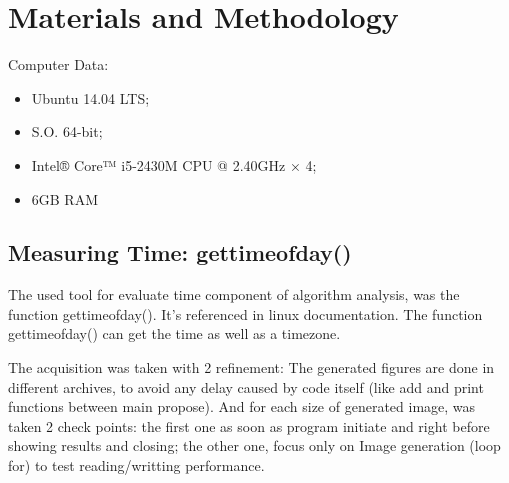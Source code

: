 \section{Materials and Methodology}\label{sec:3}

Computer Data:
  \begin{itemize}
  \item Ubuntu 14.04 LTS;
  \item S.O. 64-bit;
  \item Intel® Core™ i5-2430M CPU @ 2.40GHz × 4;
  \item 6GB RAM
  \end{itemize}

\subsection{Measuring Time: gettimeofday()}
        The used tool for evaluate time component of algorithm analysis, was the function gettimeofday(). It's referenced in linux documentation. The function gettimeofday() can get the time as well as a timezone.

        The acquisition was taken with 2 refinement: The generated figures are done in different archives, to avoid any delay caused by code itself (like add and print functions between main propose).
        And for each size of generated image, was taken 2 check points: the first one as soon as program initiate and right before showing results and closing; the other one, focus only on Image generation (loop for) to test reading/writting performance. 


